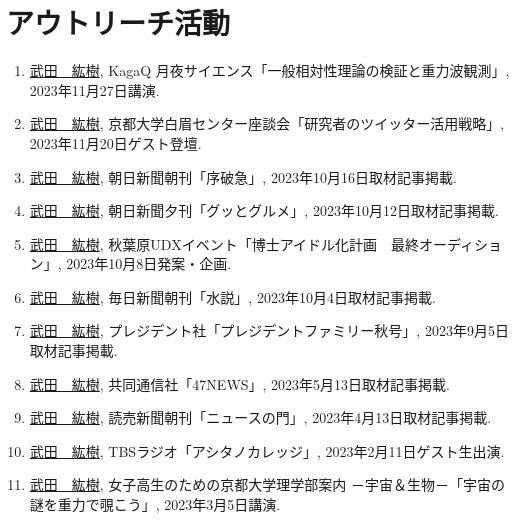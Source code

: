 \documentclass[uplatex, 11pt]{jsarticle}
\begin{document}
\section*{アウトリーチ活動}

\begin{enumerate}
\item \uline{武田　紘樹}, KagaQ 月夜サイエンス「一般相対性理論の検証と重力波観測」, 2023年11月27日講演.\\

\item \uline{武田　紘樹}, 京都大学白眉センター座談会「研究者のツイッター活用戦略」, 2023年11月20日ゲスト登壇.\\

\item \uline{武田　紘樹}, 朝日新聞朝刊「序破急」, 2023年10月16日取材記事掲載.\\

\item \uline{武田　紘樹}, 朝日新聞夕刊「グッとグルメ」, 2023年10月12日取材記事掲載.\\

\item \uline{武田　紘樹}, 秋葉原UDXイベント「博士アイドル化計画　最終オーディション」, 2023年10月8日発案・企画.\\

\item \uline{武田　紘樹}, 毎日新聞朝刊「水説」, 2023年10月4日取材記事掲載.\\

\item \uline{武田　紘樹}, プレジデント社「プレジデントファミリー秋号」, 2023年9月5日取材記事掲載.\\

\item \uline{武田　紘樹},  共同通信社「47NEWS」, 2023年5月13日取材記事掲載.\\

\item \uline{武田　紘樹}, 読売新聞朝刊「ニュースの門」, 2023年4月13日取材記事掲載.\\

\item \uline{武田　紘樹}, TBSラジオ「アシタノカレッジ」, 2023年2月11日ゲスト生出演.\\

\item \uline{武田　紘樹}, 女子高生のための京都大学理学部案内 －宇宙＆生物－「宇宙の謎を重力で覗こう」,  2023年3月5日講演.\\


\end{enumerate}
\end{document}
